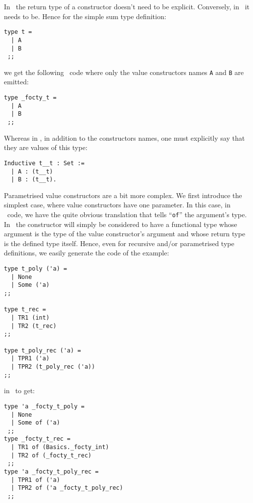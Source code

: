 In \ocaml\ the return type of a constructor doesn't need to be
explicit. Conversely, in \coq\ it needs to be. Hence for the simple
sum type definition:

{\footnotesize
\begin{lstlisting}[title=Simple sum type in \focalize]
type t =
  | A
  | B
 ;;
\end{lstlisting}
}
we get the following \ocaml\ code where only the value constructors
names {\tt A} and {\tt B} are emitted:

{\footnotesize
\begin{lstlisting}[language=MyOCaml,
                   title=Simple sum type generated in \ocaml]
type _focty_t = 
  | A
  | B
 ;;
\end{lstlisting}
}
Whereas in \coq, in addition to the constructors names, one must
explicitly say that they are values of this type:

{\footnotesize
\begin{lstlisting}[language=MyCoq,
                   title=Simple sum type generated in \coq]
Inductive t__t : Set := 
  | A : (t__t)
  | B : (t__t).
\end{lstlisting}
}

\medskip
Parametrised value constructors are a bit more complex. We first
introduce the simplest case, where value constructors have one
parameter. In this case, in \ocaml\ code, we have the quite obvious
translation that tells ``{\tt of}'' the argument's type. In \coq\,
the constructor will simply be considered to have a functional type
whose argument is the type of the value constructor's argument and
whose return type is the defined type itself.
Hence, even for recursive and/or parametrised type definitions, we
easily generate the code of the example:

{\footnotesize
\begin{lstlisting}[title=Sum types with simply parametrised value
  constructors]
type t_poly ('a) =
  | None
  | Some ('a)
;;

type t_rec =
  | TR1 (int)
  | TR2 (t_rec)
;;

type t_poly_rec ('a) =
  | TPR1 ('a)
  | TPR2 (t_poly_rec ('a))
;;
\end{lstlisting}
}
\noindent in \ocaml\ to get:

{\footnotesize
\begin{lstlisting}[language=MyOCaml, title=Sum type generated in \ocaml]
type 'a _focty_t_poly = 
  | None
  | Some of ('a)
 ;;
type _focty_t_rec = 
  | TR1 of (Basics._focty_int)
  | TR2 of (_focty_t_rec)
 ;;
type 'a _focty_t_poly_rec = 
  | TPR1 of ('a)
  | TPR2 of ('a _focty_t_poly_rec)
 ;;
\end{lstlisting}
}

